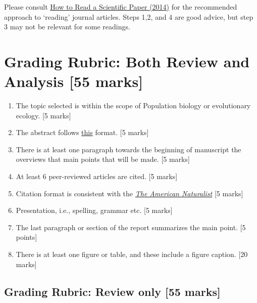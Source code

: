 \documentclass[]{book}
\begin{document}
Please consult
\href{https://www.research4life.org/blog/how-to-read-a-scientific-paper/}{How
to Read a Scientific Paper (2014)} for the recommended approach to
`reading' journal articles. Steps 1,2, and 4 are good advice, but step 3
may not be relevant for some readings.

\section{Grading Rubric: Both Review and Analysis {[}55
marks{]}}\label{grading-rubric-both-review-and-analysis-55-marks}

\begin{enumerate}
\def\labelenumi{\arabic{enumi}.}
\item
  The topic selected is within the scope of Population biology or
  evolutionary ecology. {[}5 marks{]}
\item
  The abstract follows
  \href{https://www.google.com/url?sa=t\&rct=j\&q=\&esrc=s\&source=web\&cd=\&ved=2ahUKEwjH9pDIya_sAhXig-AKHcB3BusQFjAAegQIBhAC\&url=http\%3A\%2F\%2Fwww.cbs.umn.edu\%2Fsites\%2Fdefault\%2Ffiles\%2Fpublic\%2Fdownloads\%2FAnnotated_Nature_abstract.pdf\&usg=AOvVaw2FzVPRcUQOUX2zEJXld9LQ}{this}
  format. {[}5 marks{]}
\item
  There is at least one paragraph towards the beginning of manuscript
  the overviews that main points that will be made. {[}5 marks{]}
\item
  At least 6 peer-reviewed articles are cited. {[}5 marks{]}
\item
  Citation format is consistent with the
  \href{https://www.journals.uchicago.edu/journals/an/instruct?mobileUi=0\#manuscript-format}{\emph{The
  American Naturalist}} {[}5 marks{]}
\item
  Presentation, i.e., spelling, grammar etc. {[}5 marks{]}
\item
  The last paragraph or section of the report summarizes the main point.
  {[}5 points{]}
\item
  There is at least one figure or table, and these include a figure
  caption. {[}20 marks{]}
\end{enumerate}

\subsection{Grading Rubric: Review only {[}55
marks{]}}\label{grading-rubric-review-only-55-marks}
\end{document}
